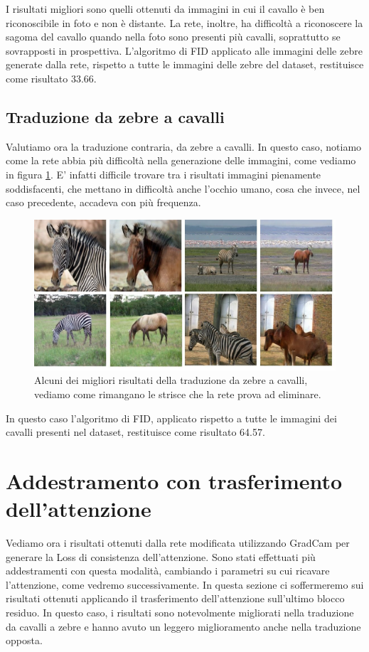 I risultati migliori sono quelli ottenuti da immagini in cui il cavallo è ben riconoscibile in foto e non è distante. La rete, inoltre, ha difficoltà a riconoscere la sagoma del cavallo quando nella foto sono presenti più cavalli, soprattutto se sovrapposti in prospettiva. L'algoritmo di FID applicato alle immagini delle zebre generate dalla rete, rispetto a tutte le immagini delle zebre del dataset, restituisce come risultato 33.66.
\subsection{Traduzione da zebre a cavalli}
Valutiamo ora la traduzione contraria, da zebre a cavalli. In questo caso, notiamo come la rete abbia più difficoltà nella generazione delle immagini, come vediamo in figura \ref{fig:Risultati Horse Cycle GAN (1)}. E' infatti difficile trovare tra i risultati immagini pienamente soddisfacenti, che mettano in difficoltà anche l'occhio umano, cosa che invece, nel caso precedente, accadeva con più frequenza.
\begin{figure}[H]
\begin{center}
\includegraphics[width=1\columnwidth]{images/CycleGan horse (1).jpeg} 
\end{center}
\caption{Alcuni dei migliori risultati della traduzione da zebre a cavalli, vediamo come rimangano le strisce che la rete prova ad eliminare.}
\label{fig:Risultati Horse Cycle GAN (1)}
\end{figure} 
In questo caso l'algoritmo di FID, applicato rispetto a tutte le immagini dei cavalli presenti nel dataset, restituisce come risultato 64.57.

\section{Addestramento con trasferimento dell'attenzione}
Vediamo ora i risultati ottenuti dalla rete modificata utilizzando GradCam per generare la Loss di consistenza dell'attenzione. Sono stati effettuati più addestramenti con questa modalità, cambiando i parametri su cui ricavare l'attenzione, come vedremo successivamente. In questa sezione ci soffermeremo sui risultati ottenuti applicando il trasferimento dell'attenzione sull'ultimo blocco residuo. In questo caso, i risultati sono notevolmente migliorati nella traduzione da cavalli a zebre e hanno avuto un leggero miglioramento anche nella traduzione opposta.
